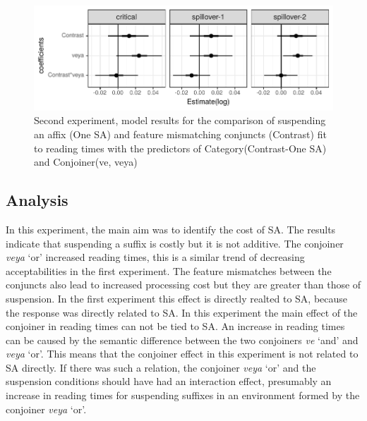 \begin{knitrout}
\color{fgcolor}\begin{figure}[hbt!]

{\centering \includegraphics[]{experiments/selfpaced/report/figure/saVcontrast-1.pdf} 

}

\caption[Second experiment, model results for the comparison of suspending an affix (One SA) and feature mismatching conjuncts (Contrast) fit to reading times with the predictors of Category(Contrast-One SA) and Conjoiner(ve, veya)]{Second experiment, model results for the comparison of suspending an affix (One SA) and feature mismatching conjuncts (Contrast) fit to reading times with the predictors of Category(Contrast-One SA) and Conjoiner(ve, veya)}\label{fig:saVcontrast}
\end{figure}


\end{knitrout}

\subsection{Analysis}

In this experiment, the main aim was to identify the cost of SA. The results indicate that suspending a suffix is costly but it is not additive. The conjoiner \textit{veya} `or' increased reading times, this is a similar trend of decreasing acceptabilities in the first experiment. The feature mismatches between the conjuncts also lead to increased processing cost but they are greater than those of suspension. In the first experiment this effect is directly realted to SA, because the response was directly related to SA. In this experiment the main effect of the conjoiner in reading times can not be tied to SA. An increase in reading times can be caused by the semantic difference between the two conjoiners \textit{ve} `and' and \textit{veya} `or'. This means that the conjoiner effect in this experiment is not related to SA directly. If there was such a relation, the conjoiner \textit{veya} `or' and the suspension conditions should have had an interaction effect, presumably an increase in reading times for suspending suffixes in an environment formed by the conjoiner \textit{veya} `or'.









